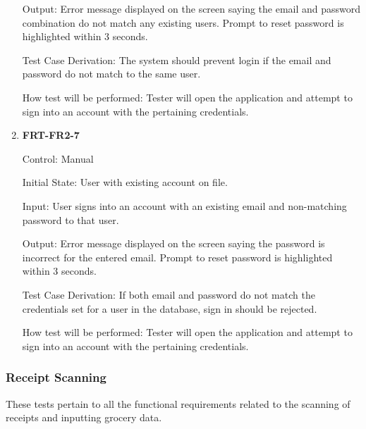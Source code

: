 \documentclass[12pt, titlepage]{article}
\begin{document}
\begin{enumerate}
Output: Error message displayed on the screen saying the email and password combination do not match any existing users. Prompt to reset password is highlighted within 3 seconds.

Test Case Derivation: The system should prevent login if the email and password do not match to the same user.
          
How test will be performed: Tester will open the application and attempt to sign into an account with the pertaining credentials.

\item{\textbf{FRT-FR2-7}}

Control: Manual
          
Initial State: User with existing account on file.
          
Input: User signs into an account with an existing email and non-matching password to that user.
          
Output: Error message displayed on the screen saying the password is incorrect for the entered email. Prompt to reset password is highlighted within 3 seconds.

Test Case Derivation: If both email and password do not match the credentials set for a user in the database, sign in
should be rejected.
          
How test will be performed: Tester will open the application and attempt to sign into an account with the pertaining credentials.

\end{enumerate}

\subsubsection{Receipt Scanning}

These tests pertain to all the functional requirements related to the scanning of receipts and inputting grocery data.
\end{document}
